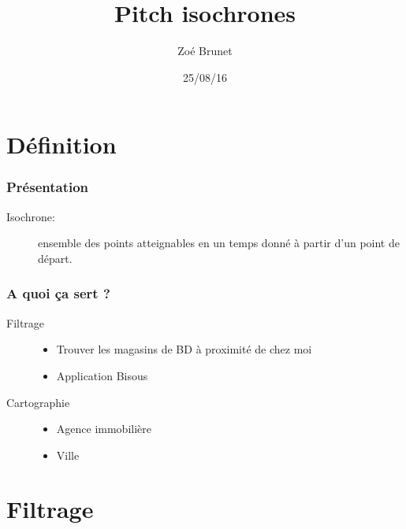 \documentclass[table]{beamer}
\title{Pitch isochrones}
\author{Zoé Brunet}
\institute[Kisio Digital] %
{
  Kisio Digital\\
  20 rue Hector Malot\\
  75012 Paris, France}
\date{25/08/16}
\begin{document}
\begin{frame}
  \titlepage
\end{frame}

\section{Définition}

\begin{frame}
  \frametitle{Présentation}

  \begin{description}
  \item[Isochrone:] ensemble des points atteignables en un temps donné à partir d'un point de départ.
  \end{description}
\end{frame}


\begin{frame}
  \frametitle{A quoi ça sert ?}
    \begin{description}
    \item[Filtrage]
    \begin{itemize} 
      \item Trouver les magasins de BD à proximité de chez moi
      \item Application Bisous 
    \end{itemize}
  \end{description}
   \begin{description}
    \item[Cartographie]
      \begin{itemize} 
        \item Agence immobilière
        \item Ville
      \end{itemize}
  \end{description}
\end{frame}

\section{Filtrage}

\end{document}
